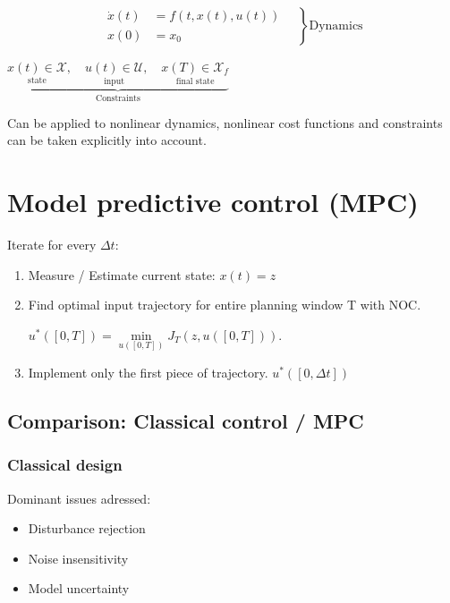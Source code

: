 \documentclass[10pt,a4paper]{scrartcl}
\begin{document}
\begin{multicols*}{3}
\begin{center}
	\begin{equation*}
	\left.
	\begin{aligned}
	\dot{x}(t)&=f\left(t,x(t),u(t)\right)\\
	x(0)&=x_0
	\end{aligned}
	\quad
	\right\}\text{Dynamics}
	\end{equation*}
	
	\finn	
	
	$\underbrace{\underset{\text{state}}{x(t)\in\mathcal{X}},\quad\underset{\text{input}}{u(t)\in\mathcal{U}},\quad \underset{\text{final state}}{x(T)\in\mathcal{X}_f}}_{\text{Constraints}}$
	
	\end{center}
	
	Can be applied to nonlinear dynamics, nonlinear cost functions and constraints can be taken explicitly into account.
	
	
	
	\section[MPC]{Model predictive control (MPC)}
	
	
	Iterate for every $\Delta t$:
	\begin{enumerate}
	\compaq
	\item
	Measure / Estimate current state: $x(t)=z$
	\item
	Find optimal input trajectory for entire planning window T with NOC. 
	
	\dahe $u^*([0,T]) = \min\limits_{u([0,T])}J_T(z,u([0,T]))$.
	\item
	Implement only the first piece of trajectory. $u^*([0,\Delta t])$
	\end{enumerate}
	
	\small
	\subsection*{Comparison: Classical control / MPC}
	
	
	\subsubsection{Classical design}
	Dominant issues adressed:
	\begin{itemize}
	\compaq
	\item Disturbance rejection
	\item Noise insensitivity
	\item Model uncertainty
	\end{itemize}
	

\end{multicols*}
\end{document}
